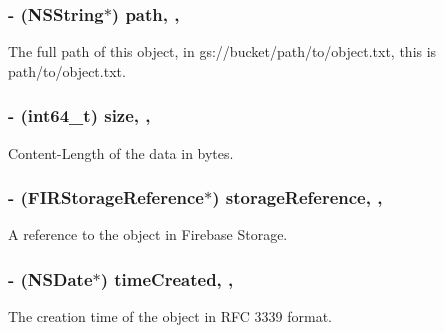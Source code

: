 \subsubsection[{path}]{\setlength{\rightskip}{0pt plus 5cm}-\/ (N\+S\+String$\ast$) path\hspace{0.3cm}{\ttfamily [read]}, {\ttfamily [nonatomic]}, {\ttfamily [copy]}}\label{interface_f_i_r_storage_metadata_a27e524765d46c62512a894ff7e361619}
The full path of this object, in gs\+://bucket/path/to/object.txt, this is path/to/object.\+txt. \hypertarget{interface_f_i_r_storage_metadata_a20b034c311ea8d5d712bb1068feaa3e0}{}
\subsubsection[{size}]{\setlength{\rightskip}{0pt plus 5cm}-\/ (int64\+\_\+t) size\hspace{0.3cm}{\ttfamily [read]}, {\ttfamily [atomic]}, {\ttfamily [assign]}}\label{interface_f_i_r_storage_metadata_a20b034c311ea8d5d712bb1068feaa3e0}
Content-\/\+Length of the data in bytes. \hypertarget{interface_f_i_r_storage_metadata_af2ad54d3a7335a0a7979462179e111b5}{}
\subsubsection[{storage\+Reference}]{\setlength{\rightskip}{0pt plus 5cm}-\/ ({\bf F\+I\+R\+Storage\+Reference}$\ast$) storage\+Reference\hspace{0.3cm}{\ttfamily [read]}, {\ttfamily [nonatomic]}, {\ttfamily [strong]}}\label{interface_f_i_r_storage_metadata_af2ad54d3a7335a0a7979462179e111b5}
A reference to the object in Firebase Storage. \hypertarget{interface_f_i_r_storage_metadata_a70044f390f5ff5ef27179498a97e4454}{}
\subsubsection[{time\+Created}]{\setlength{\rightskip}{0pt plus 5cm}-\/ (N\+S\+Date$\ast$) time\+Created\hspace{0.3cm}{\ttfamily [read]}, {\ttfamily [nonatomic]}, {\ttfamily [copy]}}\label{interface_f_i_r_storage_metadata_a70044f390f5ff5ef27179498a97e4454}
The creation time of the object in R\+F\+C 3339 format. \hypertarget{interface_f_i_r_storage_metadata_aae35491c0e2247378e80a4347cfe9d5c}{}
